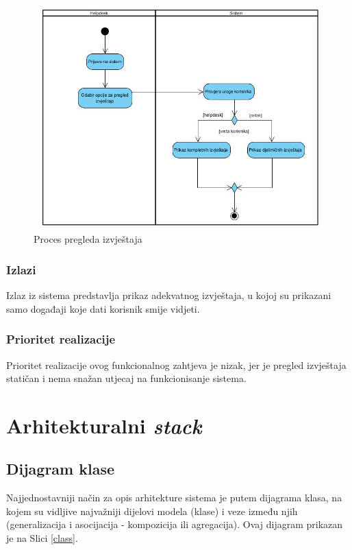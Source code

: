 \documentclass[12pt,a4paper]{article}
\begin{document}
\begin{figure}[H]
\center
\includegraphics[scale=0.5]{../res/Activity/activity12.JPG}
\caption{Proces pregleda izvještaja}
\label{act12}
\end{figure}

\subsubsection{Izlazi}

Izlaz iz sistema predstavlja prikaz adekvatnog izvještaja, u kojoj su prikazani samo događaji koje dati korisnik smije vidjeti.

\subsubsection{Prioritet realizacije}

Prioritet realizacije ovog funkcionalnog zahtjeva je nizak, jer je pregled izvještaja statičan i nema snažan utjecaj na funkcionisanje sistema.

\newpage

\section{Arhitekturalni \textit{stack}}

\subsection{Dijagram klase}

Najjednostavniji način za opis arhitekture sistema je putem dijagrama klasa, na kojem su vidljive najvažniji dijelovi modela (klase) i veze između njih (generalizacija i asocijacija - kompozicija ili agregacija). Ovaj dijagram prikazan je na Slici \ref{class}.
\end{document}
